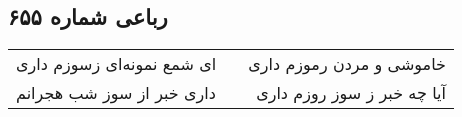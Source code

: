 \begin{center}
\section*{رباعی شماره ۶۵۵}
\label{sec:sh655}
\begin{longtable}{l p{0.5cm} r}
ای شمع نمونه‌ای زسوزم داری
&&
خاموشی و مردن رموزم داری
\\
داری خبر از سوز شب هجرانم
&&
آیا چه خبر ز سوز روزم داری
\\
\end{longtable}
\end{center}
